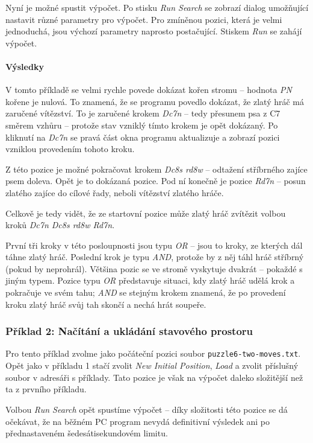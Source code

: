 \documentclass{article}
\begin{document}
Nyní je možné spustit výpočet. Po stisku \emph{Run Search} se zobrazí dialog
umožňující nastavit různé parametry pro výpočet. Pro zmíněnou pozici, která je 
velmi jednoduchá, jsou výchozí parametry naprosto postačující. Stiskem 
\emph{Run} se zahájí výpočet.

\paragraph{Výsledky}
V tomto příkladě se velmi rychle povede dokázat kořen stromu -- hodnota 
\emph{PN} kořene je nulová. To znamená, že se programu povedlo dokázat, že zlatý 
hráč má zaručené vítězství. To je zaručené krokem \emph{Dc7n} -- tedy přesunem 
psa z C7 směrem vzhůru -- protože stav vzniklý tímto krokem je opět dokázaný. Po
kliknutí na \emph{Dc7n} se pravá část okna programu aktualizuje a zobrazí pozici 
vzniklou provedením tohoto kroku.

Z této pozice je možné pokračovat krokem \emph{Dc8s rd8w} -- odtažení stříbrného
zajíce psem doleva. Opět je to dokázaná pozice. Pod ní konečně je pozice 
\emph{Rd7n} -- posun zlatého zajíce do cílové řady, neboli vítězství zlatého 
hráče.

Celkově je tedy vidět, že ze startovní pozice může zlatý hráč zvítězit volbou
kroků \emph{Dc7n Dc8s rd8w Rd7n}.

První tři kroky v této posloupnosti jsou typu \emph{OR} -- jsou to kroky, ze
kterých dál táhne zlatý hráč. Poslední krok je typu \emph{AND}, protože by z něj 
táhl hráč stříbrný (pokud by neprohrál). Většina pozic se ve stromě vyskytuje
dvakrát -- pokaždé s jiným typem. Pozice typu \emph{OR} představuje situaci, kdy
zlatý hráč udělá krok a pokračuje ve svém tahu; \emph{AND} se stejným krokem 
znamená, že po provedení kroku zlatý hráč svůj tah skončí a nechá hrát soupeře.

\subsubsection{Příklad 2: Načítání a ukládání stavového prostoru}
\label{sec:gui-example-2}
Pro tento příklad zvolme jako počáteční pozici soubor
\texttt{puzzle6-two-moves.txt}. Opět jako v příkladu 1 stačí zvolit 
\emph{New Initial Position}, \emph{Load} a zvolit příslušný soubor v adresáři s 
příklady. Tato pozice je však na výpočet daleko složitější než ta z prvního 
příkladu.

Volbou \emph{Run Search} opět spustíme výpočet -- díky složitosti této pozice se
dá očekávat, že na běžném PC program nevydá definitivní výsledek ani po 
přednastaveném šedesátisekundovém limitu.
\end{document}
